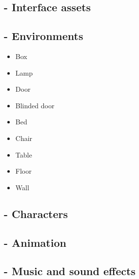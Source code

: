 \subsection{- Interface assets}
\subsection{- Environments}
\begin{itemize}  
\item Box
\item Lamp
\item Door
\item Blinded door
\item Bed
\item Chair
\item Table
\item Floor
\item Wall
\end{itemize}
        
\subsection{- Characters}
\subsection{- Animation}
\subsection{- Music and sound effects}
